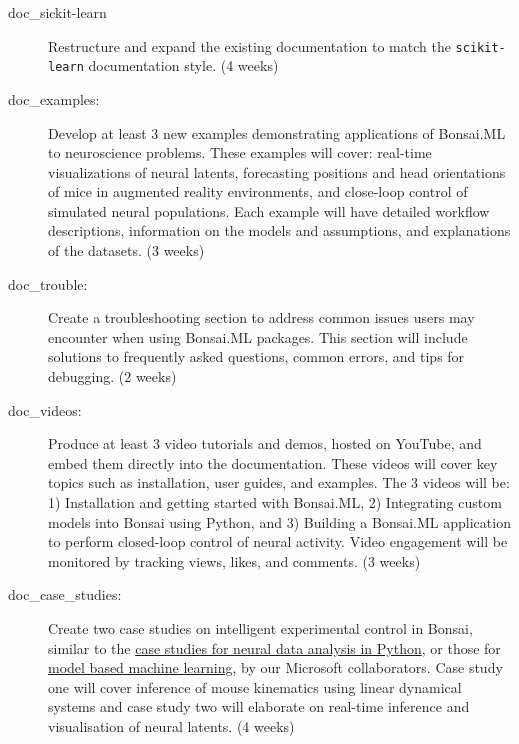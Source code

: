 \begin{description}

    \item[doc\_sickit-learn] Restructure and expand the existing documentation
        to match the \texttt{scikit-learn} documentation style. (4 weeks)

    \item[doc\_examples:] Develop at least 3 new examples demonstrating
        applications of Bonsai.ML to neuroscience problems. These examples will
        cover: real-time visualizations of neural latents, forecasting
        positions and head orientations of mice in augmented reality
        environments, and close-loop control of simulated neural populations.
        Each example will have detailed workflow
        descriptions, information on the models and assumptions, and
        explanations of the datasets. (3 weeks)

    \item[doc\_trouble:] Create a troubleshooting section to address
        common issues users may encounter when using Bonsai.ML packages. This
        section will include solutions to frequently asked questions, common
        errors, and tips for debugging. (2 weeks)

    \item[doc\_videos:] Produce at least 3 video tutorials and demos, hosted on
        YouTube, and embed them directly into the documentation. These videos
        will cover key topics such as installation, user guides, and examples.
        The 3 videos will be: 1) Installation and getting started with
        Bonsai.ML, 2) Integrating custom models into Bonsai using Python, and
        3) Building a Bonsai.ML application to perform closed-loop control of
        neural activity. Video engagement will be monitored by tracking views,
        likes, and comments. (3 weeks)

    \item[doc\_case\_studies:] Create two case studies on intelligent
        experimental control in Bonsai, similar to the
        \href{https://mark-kramer.github.io/Case-Studies-Python/intro.html}{case
        studies for neural data analysis in Python}, or those for
        \href{https://mbmlbook.com/index.html}{model based machine learning},
        by our Microsoft collaborators. Case study one will cover inference
        of mouse kinematics using linear dynamical systems and case study two
        will elaborate on real-time inference and visualisation of neural
        latents. (4 weeks)

\end{description}

